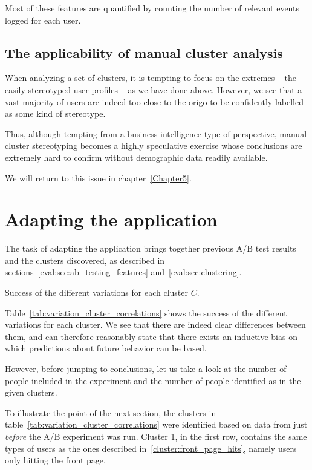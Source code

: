 Most of these features are quantified by counting the number of relevant events logged for each user.

\subsection{The applicability of manual cluster analysis}
\label{eval:sub:cluster_analysis_applicability}

When analyzing a set of clusters, it is tempting to focus on the extremes -- the easily stereotyped user profiles -- as we have done above. However, we see that a vast majority of users are indeed too close to the origo to be confidently labelled as some kind of stereotype.

Thus, although tempting from a business intelligence type of perspective, manual cluster stereotyping becomes a highly speculative exercise whose conclusions are extremely hard to confirm without demographic data readily available.

We will return to this issue in chapter~\ref{Chapter5}.

\section{Adapting the application} %
\label{eval:sec:adapting_the_application}

The task of adapting the application brings together previous A/B test results and the clusters discovered, as described in sections~\ref{eval:sec:ab_testing_features} and~\ref{eval:sec:clustering}.

\begin{table}[h]
  \centering
  
  \caption{Success of the different variations for each cluster $C$.}
  \label{tab:variation_cluster_correlations}
\end{table}

Table~\ref{tab:variation_cluster_correlations} shows the success of the different variations for each cluster. We see that there are indeed clear differences between them, and can therefore reasonably state that there exists an inductive bias on which predictions about future behavior can be based.

However, before jumping to conclusions, let us take a look at the number of people included in the experiment and the number of people identified as in the given clusters.

To illustrate the point of the next section, the clusters in table~\ref{tab:variation_cluster_correlations} were identified based on data from just \emph{before} the A/B experiment was run. Cluster 1, in the first row, contains the same types of users as the ones described in~\ref{cluster:front_page_hits}, namely users only hitting the front page.

